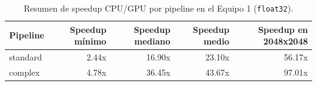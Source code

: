 \begin{table}[htbp]
\centering
\renewcommand{\arraystretch}{1.2}
\setlength{\tabcolsep}{8pt}
\begin{tabular}{|l|r|r|r|r|}
\hline
\rowcolor[gray]{0.90}
\textbf{Pipeline} & \textbf{Speedup mínimo} & \textbf{Speedup mediano} & \textbf{Speedup medio} & \textbf{Speedup en 2048x2048} \\
\hline
standard & 2.44x & 16.90x & 23.10x & 56.17x \\
\hline
complex & 4.78x & 36.45x & 43.67x & 97.01x \\
\hline
\end{tabular}
\caption{Resumen de speedup CPU/GPU por pipeline en el Equipo 1 (\texttt{float32}).}
\label{tab:cpu_gpu_equipo1_speedup_summary}
\end{table}
